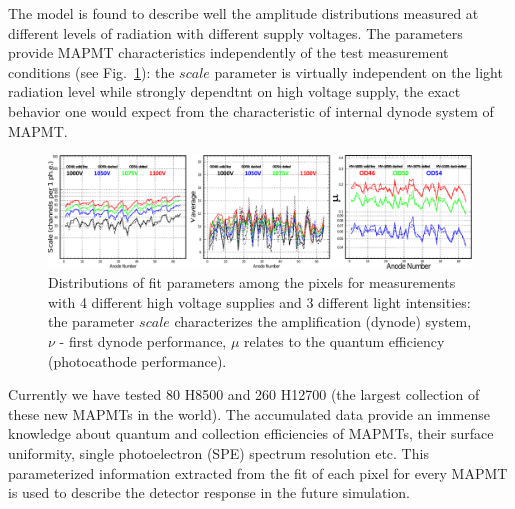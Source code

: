 The model is found to describe well the amplitude distributions measured at different levels of radiation with different supply voltages.
The parameters provide MAPMT characteristics independently of the test measurement conditions (see Fig.~\ref{fig:PavelPassport}): the $scale$ parameter is virtually independent on the light radiation level while strongly dependtnt on high voltage supply, the exact behavior one would expect from the characteristic of internal dynode system of MAPMT.

\begin{figure}[t]
	\centering
	\includegraphics[width=\linewidth]{figures/PavelPassport.pdf}
	\caption{Distributions of fit parameters among the pixels for measurements with 4 different high voltage supplies and 3 different light intensities: the parameter $scale$ characterizes the amplification (dynode) system, $\nu$ - first dynode performance, $\mu$ relates to the quantum efficiency (photocathode performance).}
	\label{fig:PavelPassport}
\end{figure}

Currently we have tested 80 H8500 and 260 H12700 (the largest collection of these new MAPMTs in the world).
The accumulated data provide an immense knowledge about quantum and collection efficiencies of MAPMTs, their surface uniformity, single photoelectron (SPE) spectrum resolution etc.
This parameterized information extracted from the fit of each pixel for every MAPMT is used to describe the detector response in the future simulation.

